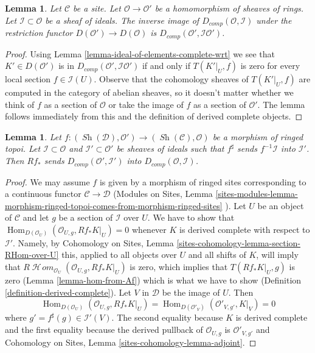 \documentclass{stacks-project}
\theoremstyle{plain}
\newtheorem{lemma}[subsection]{Lemma}
\theoremstyle{definition}
\theoremstyle{remark}
\numberwithin{equation}{subsection}
\def\Hom{\mathop{\mathrm{Hom}}\nolimits}
\def\SheafHom{\mathop{\mathcal{H}\!\mathit{om}}\nolimits}
\def\Sh{\mathop{\mathit{Sh}}\nolimits}
\begin{document}
\begin{lemma}
\label{lemma-restriction-derived-complete}
Let $\mathcal{C}$ be a site. Let $\mathcal{O} \to \mathcal{O}'$
be a homomorphism of sheaves of rings. Let $\mathcal{I} \subset \mathcal{O}$
be a sheaf of ideals. The inverse image of $D_{comp}(\mathcal{O}, \mathcal{I})$
under the restriction functor $D(\mathcal{O}') \to D(\mathcal{O})$ is
$D_{comp}(\mathcal{O}', \mathcal{I}\mathcal{O}')$.
\end{lemma}

\begin{proof}
Using Lemma \ref{lemma-ideal-of-elements-complete-wrt}
we see that $K' \in D(\mathcal{O}')$ is in
$D_{comp}(\mathcal{O}', \mathcal{I}\mathcal{O}')$
if and only if $T(K'|_U, f)$ is zero for every local section
$f \in \mathcal{I}(U)$. Observe that the cohomology sheaves of
$T(K'|_U, f)$ are computed in the category of abelian sheaves,
so it doesn't matter whether we think of $f$ as a section of
$\mathcal{O}$ or take the image of $f$ as a section of $\mathcal{O}'$.
The lemma follows immediately from this and the
definition of derived complete objects.
\end{proof}

\begin{lemma}
\label{lemma-pushforward-derived-complete}
Let $f : (\Sh(\mathcal{D}), \mathcal{O}') \to (\Sh(\mathcal{C}), \mathcal{O})$
be a morphism of ringed topoi. Let $\mathcal{I} \subset \mathcal{O}$
and $\mathcal{I}' \subset \mathcal{O}'$ be sheaves of ideals such
that $f^\sharp$ sends $f^{-1}\mathcal{I}$ into $\mathcal{I}'$.
Then $Rf_*$ sends $D_{comp}(\mathcal{O}', \mathcal{I}')$
into $D_{comp}(\mathcal{O}, \mathcal{I})$.
\end{lemma}

\begin{proof}
We may assume $f$ is given by a morphism of ringed sites corresponding
to a continuous functor $\mathcal{C} \to \mathcal{D}$
(Modules on Sites, Lemma
\ref{sites-modules-lemma-morphism-ringed-topoi-comes-from-morphism-ringed-sites}
).
Let $U$ be an object of $\mathcal{C}$ and let $g$ be a section of
$\mathcal{I}$ over $U$. We have to show that
$\Hom_{D(\mathcal{O}_U)}(\mathcal{O}_{U, g}, Rf_*K|_U) = 0$
whenever $K$ is derived complete with respect to $\mathcal{I}'$.
Namely, by Cohomology on Sites, Lemma
\ref{sites-cohomology-lemma-section-RHom-over-U}
this, applied to all objects over $U$ and all shifts of $K$,
will imply that $R\SheafHom_{\mathcal{O}_U}(\mathcal{O}_{U, g}, Rf_*K|_U)$
is zero, which implies that $T(Rf_*K|_U, g)$ is zero
(Lemma \ref{lemma-hom-from-Af}) which is what we have to show
(Definition \ref{definition-derived-complete}).
Let $V$ in $\mathcal{D}$ be the image of $U$. Then
$$
\Hom_{D(\mathcal{O}_U)}(\mathcal{O}_{U, g}, Rf_*K|_U) =
\Hom_{D(\mathcal{O}'_V)}(\mathcal{O}'_{V, g'}, K|_V) = 0
$$
where $g' = f^\sharp(g) \in \mathcal{I}'(V)$. The second equality
because $K$ is derived complete and the first equality because
the derived pullback of $\mathcal{O}_{U, g}$ is $\mathcal{O}'_{V, g'}$
and
Cohomology on Sites, Lemma \ref{sites-cohomology-lemma-adjoint}.
\end{proof}
\end{document}
